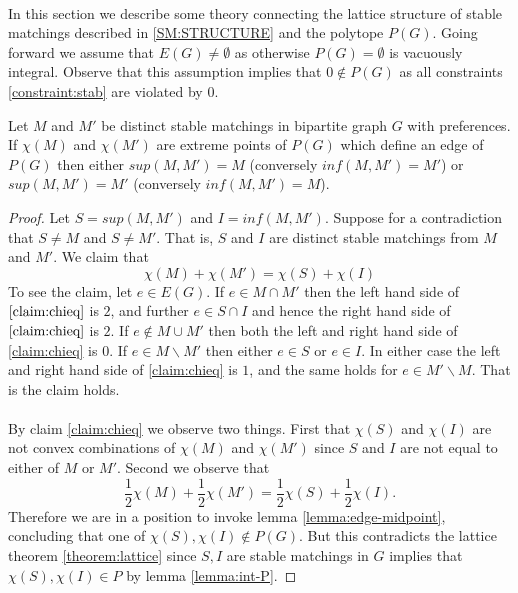 \paragraph{}
In this section we describe some theory connecting the lattice structure of stable matchings described in \ref{SM:STRUCTURE} and the polytope $P(G)$. Going forward we assume that $E(G) \neq \emptyset$ as otherwise $P(G) = \emptyset$ is vacuously integral. Observe that this assumption implies that $0 \not\in P(G)$ as all constraints \ref{constraint:stab} are violated by $0$.
\begin{lemma}\label{lemma:all-same}
Let $M$ and $M'$ be distinct stable matchings in bipartite graph $G$ with preferences. If $\chi(M)$ and $\chi(M')$ are extreme points of $P(G)$ which define an edge of $P(G)$ then either $sup(M,M') = M$ (conversely $inf(M,M') = M'$) or $sup(M,M') = M'$ (conversely $inf(M,M') = M$).
\end{lemma}
\begin{proof}
Let $S = sup(M,M')$ and $I = inf(M,M')$. Suppose for a contradiction that $S \neq M$ and $S \neq M'$. That is, $S$ and $I$ are distinct stable matchings from $M$ and $M'$. We claim that
\begin{equation} \label{claim:chieq}
\chi(M) + \chi(M') = \chi(S) + \chi(I)
 \end{equation}
To see the claim, let $e \in E(G)$. If $e \in M \cap M'$ then the left hand side of $\ref{claim:chieq}$ is $2$, and further $e \in S \cap I$ and hence the right hand side of $\ref{claim:chieq}$ is $2$. If $e \not\in M \cup M'$ then both the left and right hand side of \ref{claim:chieq} is $0$. If $e \in M \backslash M'$ then either $e \in S$ or $e \in I$. In either case the left and right hand side of \ref{claim:chieq} is $1$, and the same holds for $e \in M' \backslash M$. That is the claim holds.
\paragraph{}
By claim \ref{claim:chieq} we observe two things. First that $\chi(S)$ and $\chi(I)$ are not convex combinations of $\chi(M)$ and $\chi(M')$ since $S$ and $I$ are not equal to either of $M$ or $M'$. Second we observe that $$\frac{1}{2}\chi(M) + \frac{1}{2} \chi(M') = \frac{1}{2} \chi(S) + \frac{1}{2} \chi(I).$$
Therefore we are in a position to invoke lemma \ref{lemma:edge-midpoint}, concluding that one of $\chi(S), \chi(I) \not\in P(G)$. But this contradicts the lattice theorem \ref{theorem:lattice} since $S, I$ are stable matchings in $G$ implies that $\chi(S), \chi(I) \in P$  by lemma \ref{lemma:int-P}.
\end{proof}
